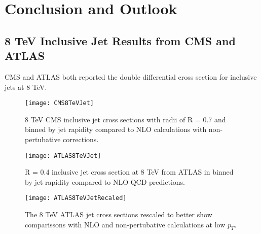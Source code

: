 \chapter{Conclusion and Outlook} \label{ch:cando}

\section{8 TeV Inclusive Jet Results from CMS and ATLAS}

CMS\cite{CMS:2013kda} and ATLAS\cite{Aaboud:2017dvo} both reported the double differential cross section for inclusive jets at 8 TeV.  

\begin{figure}[h]
\texttt{[image: CMS8TeVJet]}
\centering
\caption{8 TeV CMS inclusive jet cross sections with radii of R = 0.7 and binned by jet rapidity compared to NLO calculations with non-pertubative corrections\cite{CMS:2013kda}.}
\label{fig:CMS8TeVRescale}
\end{figure}

\begin{figure}[h]
\texttt{[image: ATLAS8TeVJet]}
\centering
\caption{R = 0.4 inclusive jet cross section at 8 TeV from ATLAS in binned by jet rapidity compared to NLO QCD predictions\cite{Aaboud:2017dvo}.}
\label{fig:ATLAS8TeV}
\end{figure}

\begin{figure}[h]
\texttt{[image: ATLAS8TeVJetRecaled]}
\centering
\caption{The 8 TeV ATLAS jet cross sections rescaled to better show comparissons with NLO and non-pertubative calculations at low $p_{T}$\cite{Aaboud:2017dvo}.}
\label{fig:ATLAS8TeVRescale}
\end{figure}

